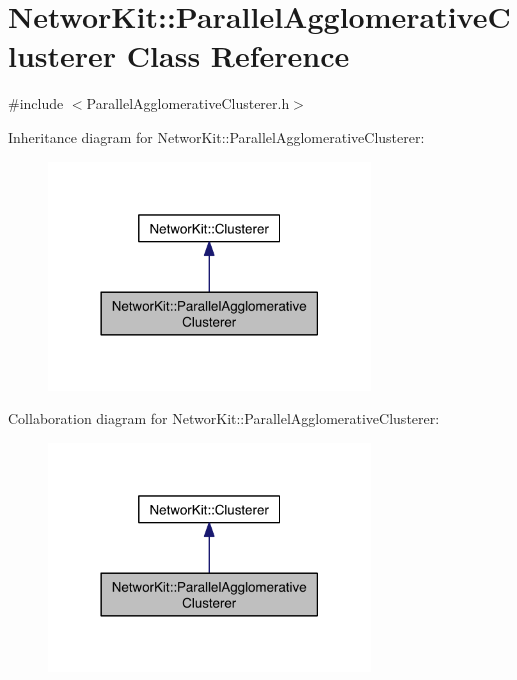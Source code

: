 \hypertarget{class_networ_kit_1_1_parallel_agglomerative_clusterer}{\section{Networ\-Kit\-:\-:Parallel\-Agglomerative\-Clusterer Class Reference}
\label{class_networ_kit_1_1_parallel_agglomerative_clusterer}
}


{\ttfamily \#include $<$Parallel\-Agglomerative\-Clusterer.\-h$>$}



Inheritance diagram for Networ\-Kit\-:\-:Parallel\-Agglomerative\-Clusterer\-:\nopagebreak
\begin{figure}[H]
\begin{center}
\leavevmode
\includegraphics[width=242pt]{class_networ_kit_1_1_parallel_agglomerative_clusterer__inherit__graph}
\end{center}
\end{figure}


Collaboration diagram for Networ\-Kit\-:\-:Parallel\-Agglomerative\-Clusterer\-:\nopagebreak
\begin{figure}[H]
\begin{center}
\leavevmode
\includegraphics[width=242pt]{class_networ_kit_1_1_parallel_agglomerative_clusterer__coll__graph}
\end{center}
\end{figure}
